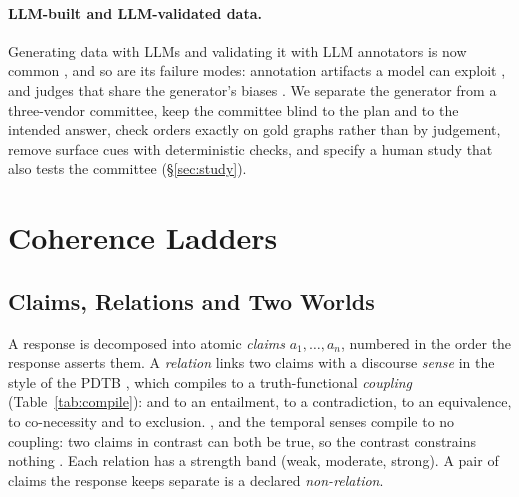 \documentclass[11pt]{article}
\begin{document}
\paragraph{LLM-built and LLM-validated data.} Generating data with LLMs and validating it with
LLM annotators is now common \citep{gilardi2023,chiang2023}, and so are its failure modes:
annotation artifacts a model can exploit \citep{gururangan2018}, and judges that share the
generator's biases \citep{zheng2023judge}. We separate the generator from a three-vendor committee,
keep the committee blind to the plan and to the intended answer, check orders exactly on gold
graphs rather than by judgement, remove surface cues with deterministic checks, and specify a
human study that also tests the committee (\S\ref{sec:study}).

\section{Coherence Ladders}
\label{sec:ladders}

\subsection{Claims, Relations and Two Worlds}
\label{sec:worlds}

A response is decomposed into atomic \emph{claims} $a_1,\dots,a_n$, numbered in the order the
response asserts them. A \emph{relation} links two claims with a discourse \emph{sense} in the
style of the PDTB \citep{pdtb}, which compiles to a truth-functional \emph{coupling}
(Table~\ref{tab:compile}):  and  to an entailment,
 to a contradiction,  to an equivalence, 
to co-necessity and  to exclusion. ,  and the
temporal senses compile to no coupling: two claims in contrast can both be true, so the contrast
constrains nothing \citep{anoncoherence}. Each relation has a strength band (weak, moderate,
strong). A pair of claims the response keeps separate is a declared \emph{non-relation}.
\end{document}
